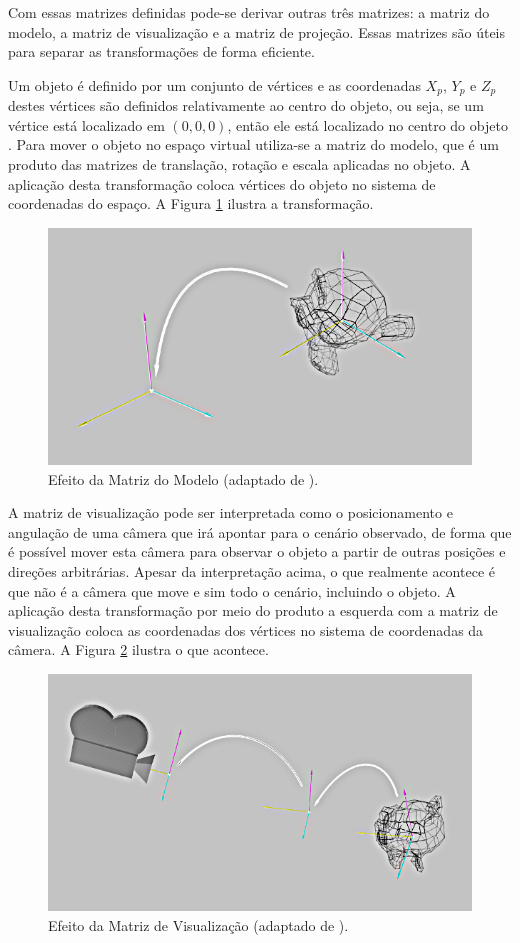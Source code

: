 {Com essas matrizes definidas pode-se derivar outras três matrizes: a matriz do
modelo, a matriz de visualização e a matriz de projeção. Essas matrizes são
úteis para separar as transformações de forma eficiente.

Um objeto é definido por um conjunto de vértices e as coordenadas $X_p$, $Y_p$ e
$Z_p$ destes vértices são definidos relativamente ao centro do objeto, ou seja,
se um vértice está localizado em $(0,0,0)$, então ele está localizado no centro
do objeto \cite{openGlTutorial}. Para mover o objeto no espaço virtual
utiliza-se a matriz do modelo, que é um produto das matrizes de translação,
rotação e escala aplicadas no objeto. A aplicação desta transformação  coloca
vértices do objeto no sistema de coordenadas do espaço. A Figura
\ref{fig:mat_modelo} ilustra a transformação.

\begin{figure}[h!]
\centering
\includegraphics[width=.5\linewidth]{figs/TG_model_matrix_neg.png}
\caption{Efeito da Matriz do Modelo (adaptado de \cite{openGlTutorial}).}
\label{fig:mat_modelo}
\end{figure}


A matriz de visualização pode ser interpretada como o posicionamento e angulação
de uma câmera que irá apontar para o cenário observado, de forma que é possível
mover esta câmera para observar o objeto a partir de outras posições e direções
arbitrárias. Apesar da interpretação acima, o  que realmente acontece é que não
é a câmera que move e sim todo o cenário, incluindo o objeto. A aplicação desta
transformação por meio do produto a esquerda com a matriz de visualização coloca
as coordenadas dos vértices no sistema de coordenadas da câmera. A Figura
\ref{fig:mat_visao} ilustra o que acontece.

\begin{figure}[h!]
\centering
\includegraphics[width=.5\linewidth]{figs/TG_view_matrix_neg.png}
\caption{Efeito da Matriz de Visualização (adaptado de \cite{openGlTutorial}).}
\label{fig:mat_visao}
\end{figure}

}
